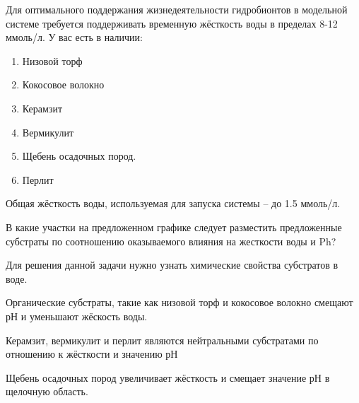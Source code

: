 
Для оптимального поддержания жизнедеятельности гидробионтов в модельной системе требуется поддерживать временную жёсткость воды в пределах 8-12 ммоль/л. У вас есть в наличии:

\begin{enumerate}
    \item Низовой торф
    \item Кокосовое волокно
    \item Керамзит
    \item Вермикулит
    \item Щебень осадочных пород. 
    \item Перлит 
\end{enumerate}

Общая жёсткость воды, используемая для запуска системы – до 1.5 ммоль/л.

В какие участки на предложенном графике следует разместить предложенные субстраты по соотношению оказываемого влияния на жесткости воды и Ph?


\explanationSection


Для решения данной задачи нужно узнать химические свойства субстратов в воде.

Органические субстраты, такие как низовой торф и кокосовое волокно смещают рН и уменьшают жёскость воды.

Керамзит, вермикулит и перлит являются нейтральными субстратами по отношению к жёсткости и значению рН

Щебень осадочных пород увеличивает жёсткость и смещает значение рН в щелочную область.

